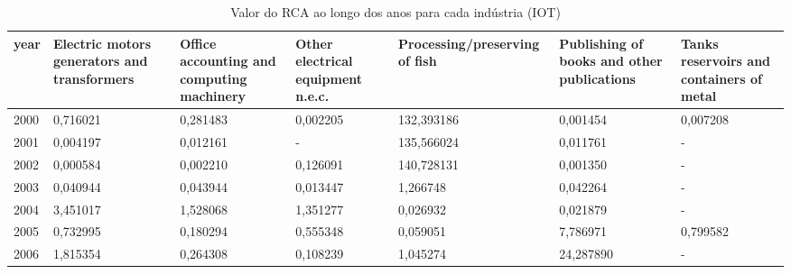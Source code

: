 \begin{table}
\centering
\caption{Valor do RCA ao longo dos anos para cada indústria (IOT)}
\begin{tabular}{p{1cm}p{2cm}p{2cm}p{2cm}p{2cm}p{2cm}p{2cm}}
\toprule
 year &  Electric motors generators and transformers &  Office accounting and computing machinery &  Other electrical equipment n.e.c. &  Processing/preserving of fish &  Publishing of books and other publications &  Tanks reservoirs and containers of metal \\
\midrule
 2000 &                                     0,716021 &                                   0,281483 &                           0,002205 &                     132,393186 &                                    0,001454 &                                  0,007208 \\
 2001 &                                     0,004197 &                                   0,012161 &                                  - &                     135,566024 &                                    0,011761 &                                         - \\
 2002 &                                     0,000584 &                                   0,002210 &                           0,126091 &                     140,728131 &                                    0,001350 &                                         - \\
 2003 &                                     0,040944 &                                   0,043944 &                           0,013447 &                       1,266748 &                                    0,042264 &                                         - \\
 2004 &                                     3,451017 &                                   1,528068 &                           1,351277 &                       0,026932 &                                    0,021879 &                                         - \\
 2005 &                                     0,732995 &                                   0,180294 &                           0,555348 &                       0,059051 &                                    7,786971 &                                  0,799582 \\
 2006 &                                     1,815354 &                                   0,264308 &                           0,108239 &                       1,045274 &                                   24,287890 &                                         - \\

\end{tabular}
\end{table}
